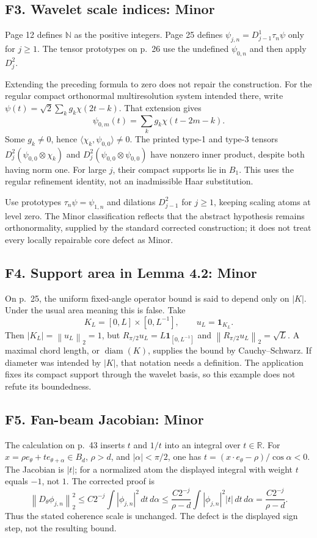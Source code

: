\documentclass[10pt]{article}
\begin{document}
\subsection*{F3. Wavelet scale indices: Minor}
Page 12 defines \(\mathbb N\) as the positive integers. Page 25 defines \(\psi_{j,n}=D^1_{j-1}\tau_n\psi\) only for \(j\ge1\). The tensor prototypes on p. 26 use the undefined \(\psi_{0,n}\) and then apply \(D_j^2\).\par
Extending the preceding formula to zero does not repair the construction. For the regular compact orthonormal multiresolution system intended there, write \(\psi(t)=\sqrt2\sum_k g_k\chi(2t-k)\). That extension gives \[\psi_{0,m}(t)=\sum_k g_k\chi(t-2m-k).\] Some \(g_k\ne0\), hence \(\langle \chi_k,\psi_{0,0}\rangle\ne0\). The printed type-1 and type-3 tensors \(D_j^2(\psi_{0,0}\otimes\chi_k)\) and \(D_j^2(\psi_{0,0}\otimes\psi_{0,0})\) have nonzero inner product, despite both having norm one. For large \(j\), their compact supports lie in \(B_1\). This uses the regular refinement identity, not an inadmissible Haar substitution.\par
Use prototypes \(\tau_n\psi=\psi_{1,n}\) and dilations \(D_{j-1}^2\) for \(j\ge1\), keeping scaling atoms at level zero. The Minor classification reflects that the abstract hypothesis remains orthonormality, supplied by the standard corrected construction; it does not treat every locally repairable core defect as Minor.\par
\subsection*{F4. Support area in Lemma 4.2: Minor}
On p. 25, the uniform fixed-angle operator bound is said to depend only on \(|K|\). Under the usual area meaning this is false. Take \[K_L=[0,L]\times[0,L^{-1}],\qquad u_L=\mathbf1_{K_L}.\] Then \(|K_L|=\left\lVert u_L\right\rVert_2=1\), but \(R_{\pi/2}u_L=L\mathbf1_{[0,L^{-1}]}\) and \(\left\lVert R_{\pi/2}u_L\right\rVert_2=\sqrt L\). A maximal chord length, or \(\operatorname{diam}(K)\), supplies the bound by Cauchy–Schwarz. If diameter was intended by \(|K|\), that notation needs a definition. The application fixes its compact support through the wavelet basis, so this example does not refute its boundedness.\par
\subsection*{F5. Fan-beam Jacobian: Minor}
The calculation on p. 43 inserts \(t\) and \(1/t\) into an integral over \(t\in\mathbb R\). For \(x=\rho e_\theta+t e_{\theta+\alpha}\in B_d\), \(\rho>d\), and \(|\alpha|<\pi/2\), one has \(t=(x\cdot e_\theta-\rho)/\cos\alpha<0\). The Jacobian is \(|t|\); for a normalized atom the displayed integral with weight \(t\) equals \(-1\), not \(1\). The corrected proof is \[\left\lVert D_\theta\phi_{j,n}\right\rVert_2^2
\le C2^{-j}\int|\phi_{j,n}|^2\,dt\,d\alpha
\le \frac{C2^{-j}}{\rho-d}
       \int|\phi_{j,n}|^2|t|\,dt\,d\alpha
=\frac{C2^{-j}}{\rho-d}.\] Thus the stated coherence scale is unchanged. The defect is the displayed sign step, not the resulting bound.\par
\end{document}
